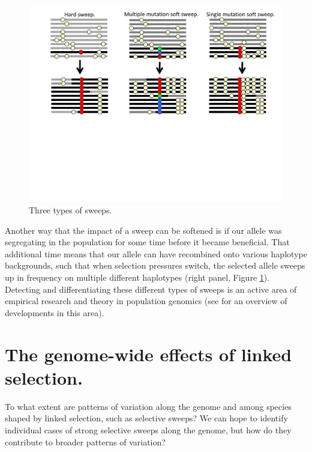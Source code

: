 \begin{figure}
\begin{center}
\includegraphics[width=\textwidth]{figures/Hitchhiking/Soft_sweeps.pdf}
\end{center}
\caption{Three types of sweeps. } \label{fig:soft_sweep_haps}
\end{figure}

Another way that the impact of a sweep can be softened is if our
allele was segregating in the population for some time before it
became beneficial. That additional time means that our allele can have
recombined onto various haplotype backgrounds, such that when
selection pressures switch, the selected allele sweeps up in frequency on 
multiple different haplotypes (right panel, Figure \ref{fig:soft_sweep_haps}). 
Detecting and differentiating these different types of sweeps is an active area of
empirical research and theory in population genomics (see \citet{hermisson2017soft} for an overview of
developments in this area).


\section{The genome-wide effects of linked selection.}

To what extent are patterns of variation along the genome and
  among species shaped by linked selection, such as selective sweeps? 
We can hope to identify individual cases of strong selective sweeps
along the genome, but how do they contribute to broader patterns of
variation?

